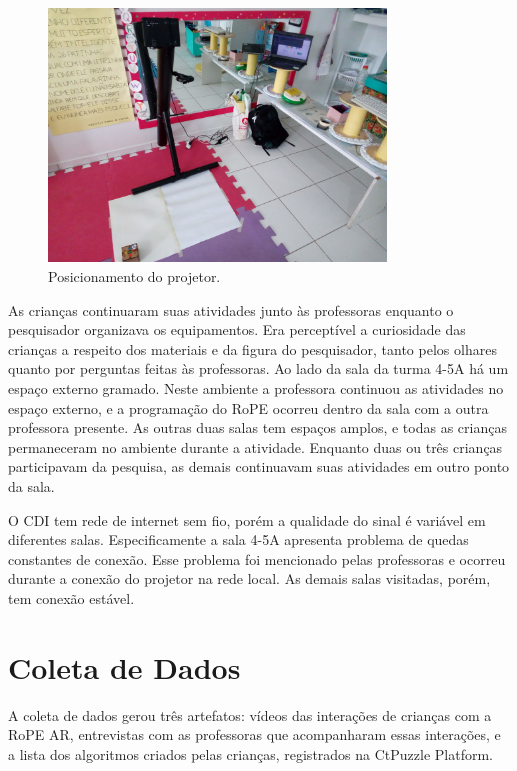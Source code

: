 \begin{figure}[!h]
    \centering
    \includegraphics[width=0.8\textwidth,fbox]{figs/setting_projector.jpg}
    \caption{Posicionamento do projetor.}
    \label{fig:setting}
\end{figure}

As crianças continuaram suas atividades junto às professoras enquanto o pesquisador organizava os equipamentos. Era perceptível a curiosidade das crianças a respeito dos materiais e da figura do pesquisador, tanto pelos olhares quanto por perguntas feitas às professoras. Ao lado da sala da turma 4-5A há um espaço externo gramado. Neste ambiente a professora continuou as atividades no espaço externo, e a programação do RoPE ocorreu dentro da sala com a outra professora presente. As outras duas salas tem espaços amplos, e todas as crianças permaneceram no ambiente durante a atividade. Enquanto duas ou três crianças participavam da pesquisa, as demais continuavam suas atividades em outro ponto da sala.

O CDI tem rede de internet sem fio, porém a qualidade do sinal é variável em diferentes salas. Especificamente a sala 4-5A apresenta problema de quedas constantes de conexão. Esse problema foi mencionado pelas professoras e ocorreu durante a conexão do projetor na rede local. As demais salas visitadas, porém, tem conexão estável.

\section{Coleta de Dados}
\label{sec:protocolo}
A coleta de dados gerou três artefatos: vídeos das interações de crianças com a RoPE AR, entrevistas com as professoras que acompanharam essas interações, e a lista dos algoritmos criados pelas crianças, registrados na CtPuzzle Platform. 

